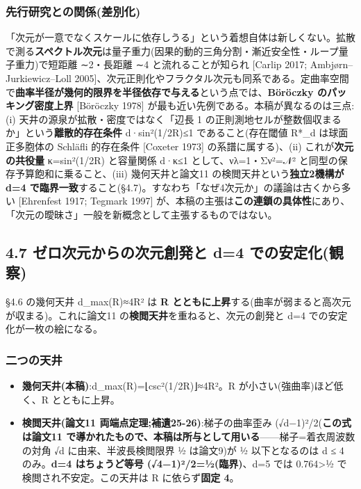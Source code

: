 \documentclass[
]{ltjsarticle}
\providecommand{\tightlist}{%
  \setlength{\itemsep}{0pt}\setlength{\parskip}{0pt}}
\begin{document}
\subsubsection{先行研究との関係(差別化)}\label{ux5148ux884cux7814ux7a76ux3068ux306eux95a2ux4fc2ux5deeux5225ux5316}

「次元が一意でなくスケールに依存しうる」という着想自体は新しくない。拡散で測る\textbf{スペクトル次元}は量子重力(因果的動的三角分割・漸近安全性・ループ量子重力)で短距離
∼2・長距離 ∼4 と流れることが知られ {[}Carlip 2017;
Ambjørn--Jurkiewicz--Loll
2005{]}、次元正則化やフラクタル次元も同系である。定曲率空間で\textbf{曲率半径が幾何的限界を半径依存で与える}という点では、\textbf{Böröczky
のパッキング密度上界} {[}Böröczky 1978{]}
が最も近い先例である。本稿が異なるのは三点:(i)
天井の源泉が拡散・密度ではなく「辺長 1
の正則測地セルが整数個収まるか」という\textbf{離散的存在条件}
d·sin²(1/2R)≤1 であること(存在閾値 R*\_d は球面正多胞体の Schläfli
的存在条件 {[}Coxeter 1973{]} の系譜に属する)、(ii)
これが\textbf{次元の共役量} κ=sin²(1/2R) と容量関係 d·κ≤1
として、νλ=1・Σν²=𝒩² と同型の保存予算飽和に乗ること、(iii)
幾何天井と論文11 の検閲天井という\textbf{独立2機構が d=4
で臨界一致}すること(§4.7)。すなわち「なぜ4次元か」の議論は古くから多い
{[}Ehrenfest 1917; Tegmark 1997{]}
が、本稿の主張は\textbf{この連鎖の具体性}にあり、「次元の曖昧さ」一般を新概念として主張するものではない。

\subsection{4.7 ゼロ次元からの次元創発と d=4
での安定化(観察)}\label{ux30bcux30edux6b21ux5143ux304bux3089ux306eux6b21ux5143ux5275ux767aux3068-d4-ux3067ux306eux5b89ux5b9aux5316ux89b3ux5bdf}

§4.6 の幾何天井 d\_max(R)≈4R² は \textbf{R
とともに上昇}する(曲率が弱まると高次元が収まる)。これに論文11
の\textbf{検閲天井}を重ねると、次元の創発と d=4
での安定化が一枚の絵になる。

\subsubsection{二つの天井}\label{ux4e8cux3064ux306eux5929ux4e95}

\begin{itemize}
\tightlist
\item
  \textbf{幾何天井(本稿)}:d\_max(R)=⌊csc²(1/2R)⌋≈4R²。R
  が小さい(強曲率)ほど低く、R とともに上昇。
\item
  \textbf{検閲天井(論文11 両端点定理;補遺25-26)}:梯子の曲率歪み
  (√d−1)²/2(\textbf{この式は論文11
  で導かれたもので、本稿は所与として用いる}------梯子=着衣周波数の対角
  √d に由来、半波長検閲限界 ½ は論文9)が ½ 以下となるのは d ≤ 4
  のみ。\textbf{d=4 はちょうど等号 (√4−1)²/2=½(臨界)}、d=5 では
  0.764\textgreater½ で検閲され不安定。この天井は R に依らず\textbf{固定
  4}。
\end{itemize}
\end{document}
